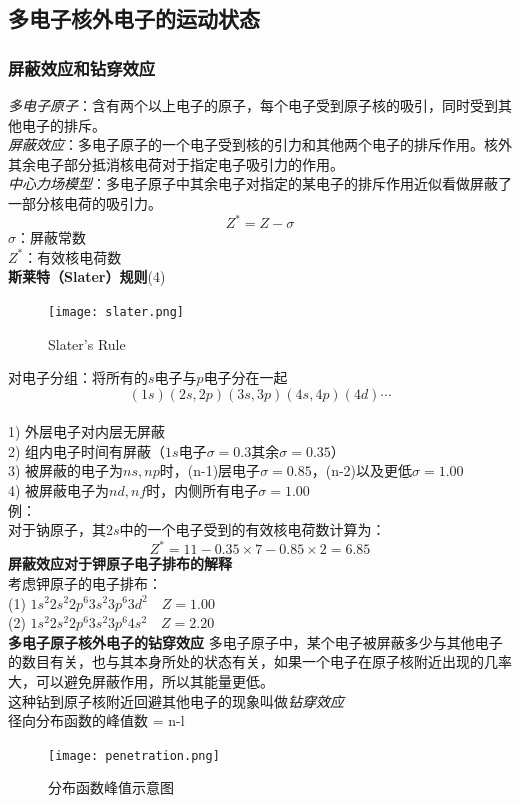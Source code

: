 \documentclass[utf8,a4paper,12pt]{ctexart}
\begin{document}
\subsection{多电子核外电子的运动状态}
\subsubsection{屏蔽效应和钻穿效应}
\emph{多电子原子}：含有两个以上电子的原子，每个电子受到原子核的吸引，同时受到其他电子的排斥。\\
\emph{屏蔽效应}：多电子原子的一个电子受到核的引力和其他两个电子的排斥作用。核外其余电子部分抵消核电荷对于指定电子吸引力的作用。\\
\emph{中心力场模型}：多电子原子中其余电子对指定的某电子的排斥作用近似看做屏蔽了一部分核电荷的吸引力。
\[
Z^* = Z -\sigma
\]
$\sigma$：屏蔽常数\\
$Z^*$：有效核电荷数\\
{\bf 斯莱特（Slater）规则}(\figurename{4})\\
\begin{figure}[H]
\centering
\texttt{[image: slater.png]}
\caption{Slater’s Rule}
\end{figure}
对电子分组：将所有的$s$电子与$p$电子分在一起\\
$$(1s)(2s,2p)(3s,3p)(4s,4p)(4d)\cdots$$\\
1) 外层电子对内层无屏蔽\\
2) 组内电子时间有屏蔽（$1s$电子$\sigma = 0.3$其余$\sigma = 0.35$）\\
3) 被屏蔽的电子为$ns,np$时，(n-1)层电子$\sigma = 0.85$，(n-2)以及更低$\sigma = 1.00$\\
4) 被屏蔽电子为$nd,nf$时，内侧所有电子$\sigma = 1.00$\\
{\kaishu \small 例：\\
对于钠原子，其$2s$中的一个电子受到的有效核电荷数计算为：
\[
Z^* = 11 - 0.35\times7- 0.85\times2 = 6.85
\]}
{\bf 屏蔽效应对于钾原子电子排布的解释\\}
考虑钾原子的电子排布：\\
(1) $1s^2 2s^2 2p^6 3s^2 3p^6 3d^2  \quad Z = 1.00$\\
(2) $1s^2 2s^2 2p^6 3s^2 3p^6 4s^2  \quad Z = 2.20$\\
{\bf 多电子原子核外电子的钻穿效应}
多电子原子中，某个电子被屏蔽多少与其他电子的数目有关，也与其本身所处的状态有关，如果一个电子在原子核附近出现的几率大，可以避免屏蔽作用，所以其能量更低。\\
这种钻到原子核附近回避其他电子的现象叫做\emph{钻穿效应}\\
径向分布函数的峰值数 = n-l\\
\begin{figure}[H]
\centering
\texttt{[image: penetration.png]}
\caption{分布函数峰值示意图}
\end{figure}
\end{document}
